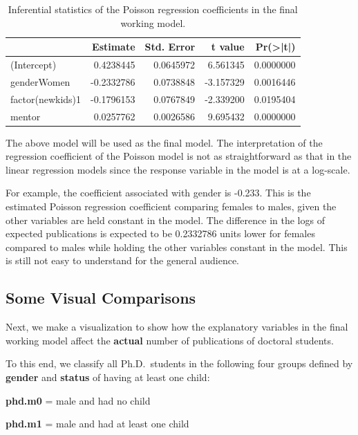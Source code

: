 \documentclass[
]{book}
\begin{document}
\begin{table}

\caption{\label{tab:unnamed-chunk-181}Inferential statistics of 
the Poisson regression coefficients  in the final working model.}
\centering
\begin{tabular}[t]{l|r|r|r|r}
\hline
  & Estimate & Std. Error & t value & Pr(>|t|)\\
\hline
(Intercept) & 0.4238445 & 0.0645972 & 6.561345 & 0.0000000\\
\hline
genderWomen & -0.2332786 & 0.0738848 & -3.157329 & 0.0016446\\
\hline
factor(newkids)1 & -0.1796153 & 0.0767849 & -2.339200 & 0.0195404\\
\hline
mentor & 0.0257762 & 0.0026586 & 9.695432 & 0.0000000\\
\hline
\end{tabular}
\end{table}

The above model will be used as the final model. The interpretation of the regression coefficient of the Poisson model is not as straightforward as that in the linear regression models since the response variable in the model is at a log-scale.

For example, the coefficient associated with gender is -0.233. This is the estimated Poisson regression coefficient comparing females to males, given the other variables are held constant in the model. The difference in the logs of expected publications is expected to be 0.2332786 units lower for females compared to males while holding the other variables constant in the model. This is still not easy to understand for the general audience.

\hypertarget{some-visual-comparisons-1}{%
\subsection{Some Visual Comparisons}\label{some-visual-comparisons-1}}

Next, we make a visualization to show how the explanatory variables in the final working model affect the \textbf{actual} number of publications of doctoral students.

To this end, we classify all Ph.D.~students in the following four groups defined by \textbf{gender} and \textbf{status} of having at least one child:

\textbf{phd.m0} = male and had no child

\textbf{phd.m1} = male and had at least one child
\end{document}
